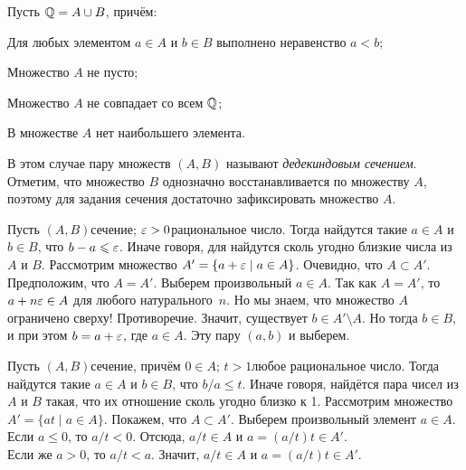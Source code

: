 \documentclass[a4paper,12pt]{article}
\begin{document}
\vspace*{-6mm}
\vspace*{-6mm}

Пусть $\mathbb{Q} = A \cup B$, причём:
\begin{nums}{-3}
\item
Для любых элементом $a \in A$ и $b \in B$ выполнено неравенство $a < b$;
\item
Множество $A$ не пусто;
\item
Множество $A$ не совпадает со всем $\mathbb{Q}$;
\item
\label{nomax}
В множестве $A$ нет наибольшего элемента.
\end{nums}
В этом случае пару множеств $(A, B)$ называют \emph{дедекиндовым сечением}. \\ Отметим, что множество $B$ однозначно восстанавливается по множеству $A$, поэтому для задания сечения достаточно зафиксировать множество $A$.

\label{density1}
Пусть $(A,B)$\т сечение; $\varepsilon > 0$\т рациональное число. Тогда найдутся такие $a\in A$ и $b\in B$, что $b-a \leqslant \varepsilon$.
Иначе говоря, для найдутся сколь угодно близкие числа из $A$ и $B$.
Рассмотрим множество $A' = \{a+\varepsilon\mid a\in A\}$. 
Очевидно, что $A \subset A'$.
Предположим, что $A = A'$. 
Выберем произвольный $a \in A$. 
Так как $A = A'$, то $a + n\varepsilon \in A$ для любого натурального~$n$. 
Но мы знаем, что множество $A$ ограничено сверху! 
Противоречие.
Значит, существует $b \in A' \setminus A$. 
Но тогда $b\in B$, и при этом $b = a+\varepsilon$, где $a \in A$. 
Эту пару $(a,b)$ и выберем.

\label{density2}
Пусть $(A,B)$\т сечение, причём $0 \in A$; $t > 1$\т любое рациональное число. Тогда найдутся такие $a\in A$ и $b\in B$, что $b/a \le t$. Иначе говоря, найдётся пара чисел из $A$ и $B$ такая, что их отношение сколь угодно близко к 1.
Рассмотрим множество $A' = \{at\mid a\in A\}$. 
Покажем, что $A \subset A'$.
Выберем произвольный элемент $a \in A$. 
Если $a \le 0$, то $a/t < 0$. 
Отсюда, $a/t \in A$ и $a = (a/t)t \in A'$.\\
Если же $a > 0$, то $a/t < a$. 
Значит, $a/t \in A$ и $a = (a/t)t \in A'$.
\end{document}
